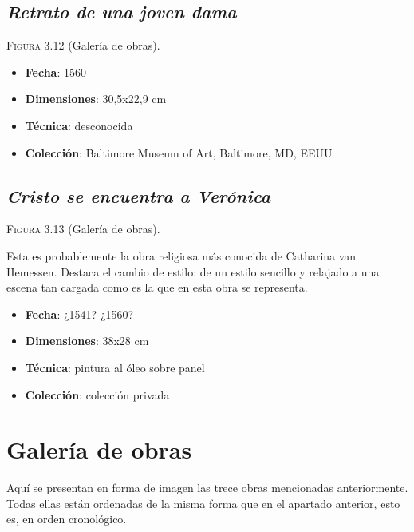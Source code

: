 \documentclass[12pt]{report}
\begin{document}
\section{\textit{Retrato de una joven dama}}

\textsc{Figura 3.12} (Galería de obras).\bigskip

\begin{itemize}
	\item \textbf{Fecha}: 1560
	\item \textbf{Dimensiones}: 30,5x22,9 cm
	\item \textbf{Técnica}: desconocida
	\item \textbf{Colección}: Baltimore Museum of Art, Baltimore, MD, EEUU
\end{itemize}

\section{\textit{Cristo se encuentra a Verónica}}

\textsc{Figura 3.13} (Galería de obras).\bigskip

Esta es probablemente la obra religiosa más conocida de Catharina van Hemessen. Destaca el cambio de estilo: de un estilo sencillo y relajado a una escena tan cargada como es la que en esta obra se representa.
\begin{itemize}
	\item \textbf{Fecha}: ¿1541?-¿1560?
	\item \textbf{Dimensiones}: 38x28 cm
	\item \textbf{Técnica}: pintura al óleo sobre panel
	\item \textbf{Colección}: colección privada
\end{itemize}

\chapter{Galería de obras}

Aquí se presentan en forma de imagen las trece obras mencionadas anteriormente. Todas ellas están ordenadas de la misma forma que en el apartado anterior, esto es, en orden cronológico.\bigskip
\end{document}
